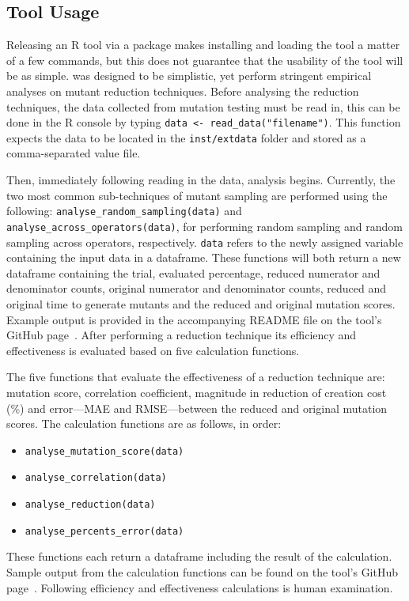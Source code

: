 \subsection{Tool Usage}

Releasing an R tool via a package makes installing and loading the tool
a matter of a few commands, but this does not guarantee that the usability
of the tool will be as simple. \mr was designed to be simplistic,
yet perform stringent empirical analyses on mutant reduction techniques. Before
analysing the reduction techniques, the data collected from mutation testing
must be read in, this can be done in the R console by typing {\small\texttt{data <- read\_data("filename")}}.
This function expects the data to be located in the \texttt{inst/extdata} folder
and stored as a comma-separated value file.

Then, immediately following reading in the data, analysis begins. Currently, the two most common
sub-techniques of mutant sampling are performed using the following:
\texttt{analyse\_random\_sampling(data)} and \texttt{analyse\_across\_operators(data)},
for performing random sampling and random sampling across operators, respectively. \texttt{data} refers to the
newly assigned variable containing the input data in a dataframe.
These functions will both return a new dataframe containing the trial, evaluated percentage, reduced
numerator and denominator counts, original numerator and denominator counts, reduced and original time
to generate mutants and the reduced and original mutation scores. Example output is provided in the accompanying
README file on the tool's GitHub page~\cite{mrstudyr}. After performing a reduction technique its efficiency and
effectiveness is evaluated based on five calculation functions.

The five functions that evaluate the effectiveness of a reduction technique are: mutation score, correlation coefficient, magnitude
in reduction of creation cost (\%) and error---MAE and RMSE---between the reduced and original mutation scores.
The calculation functions are as follows, in order:
\begin{itemize}
\item \texttt{analyse\_mutation\_score(data)}
\item \texttt{analyse\_correlation(data)}
\item \texttt{analyse\_reduction(data)}
\item \texttt{analyse\_percents\_error(data)}
\end{itemize}
These functions each return a dataframe including the result of the calculation.
Sample output from the calculation functions can be found on
the tool's GitHub page~\cite{mrstudyr}. Following efficiency and effectiveness calculations is human examination.

